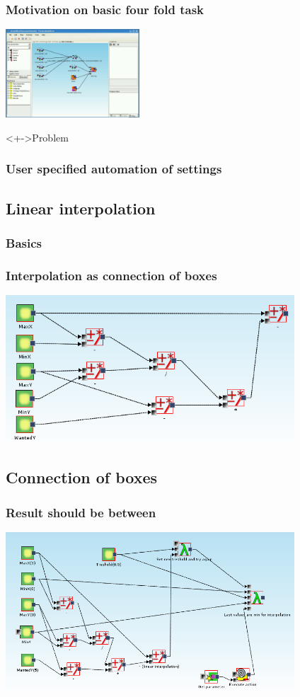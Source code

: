 \documentclass{beamer}
\begin{document}
\begin{frame}
	\frametitle{Motivation on basic four fold task}
	\includegraphics[width=5cm]{exampleMotivation1}
	\begin{block}<+->{Problem}
	\end{block}
\end{frame}

\begin{frame}
	\frametitle{User specified automation of settings}
\end{frame}

\subsection{Linear interpolation}
\begin{frame}
	\frametitle{Basics}
\end{frame}

\begin{frame}
	\frametitle{Interpolation as connection of boxes}
	\includegraphics[width=10.8cm]{linearInterpolation}
\end{frame}

\subsection{Connection of boxes}
\begin{frame}
	\frametitle{Result should be between}
	\includegraphics[width=10.8cm]{exampleMainRecursionPart}
\end{frame}
\end{document}
